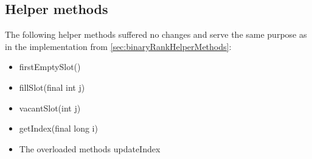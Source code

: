 \subsection{Helper methods} \label{sec:dontCaresRankHelperMethods}

The following helper methods suffered no changes and serve the same purpose as in the implementation from \ref{sec:binaryRankHelperMethods}:
\begin{itemize}
    \item
    {\ttfamily firstEmptySlot()}
    
    \item
    {\ttfamily fillSlot(final int j)}
    
    \item
    {\ttfamily vacantSlot(int j)}
    
    \item
    {\ttfamily getIndex(final long i)}
    
    \item
    The overloaded methods {\ttfamily updateIndex}
\end{itemize}

